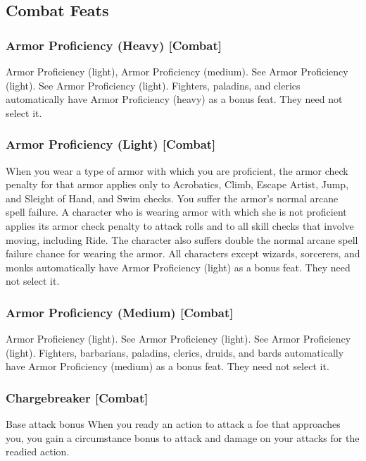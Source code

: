 \subsection{Combat Feats}

\subsubsection{Armor Proficiency (Heavy) [Combat]}
 Armor Proficiency (light), Armor Proficiency (medium).
 See Armor Proficiency (light).
 See Armor Proficiency (light).
 Fighters, paladins, and clerics automatically have Armor Proficiency (heavy) as a bonus feat. They need not select it.

\subsubsection{Armor Proficiency (Light) [Combat]}
 When you wear a type of armor with which you are proficient, the armor check penalty for that armor applies only to Acrobatics, Climb, Escape Artist, Jump, and Sleight of Hand, and Swim checks. You suffer the armor's normal arcane spell failure.
 A character who is wearing armor with which she is not proficient applies its armor check penalty to attack rolls and to all skill checks that involve moving, including Ride. The character also suffers double the normal arcane spell failure chance for wearing the armor.
 All characters except wizards, sorcerers, and monks automatically have Armor Proficiency (light) as a bonus feat. They need not select it.

\subsubsection{Armor Proficiency (Medium) [Combat]}
 Armor Proficiency (light).
 See Armor Proficiency (light).
 See Armor Proficiency (light).
 Fighters, barbarians, paladins, clerics, druids, and bards automatically have Armor Proficiency (medium) as a bonus feat. They need not select it.

\subsubsection{Chargebreaker [Combat]}
 Base attack bonus 
 When you ready an action to attack a foe that approaches you, you gain a  circumstance bonus to attack and damage on your attacks for the readied action.

